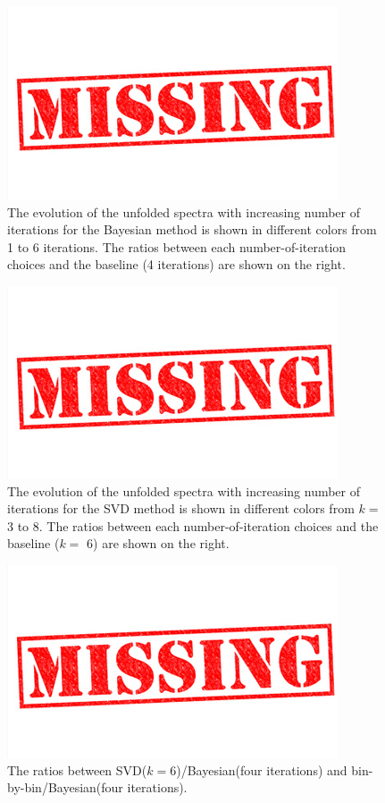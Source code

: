 \begin{figure}[bth]
\centering
\includegraphics[width=.2\textwidth]{missing}
\caption{The evolution of the unfolded spectra with increasing number of iterations for the Bayesian method is shown in different colors from 1 to 6 iterations.
The ratios between each number-of-iteration choices and the baseline (4 iterations) are shown on the right.}
\label{fig:unfBayesReg_pPb}
\end{figure}

\begin{figure}[bth]
\centering
\includegraphics[width=.2\textwidth]{missing}
\caption{The evolution of the unfolded spectra with increasing number of iterations for the SVD method is shown in different colors from $k=$ 3 to 8.
The ratios between each number-of-iteration choices and the baseline ($k=$ 6) are shown on the right.}
\label{fig:unfSVDReg_pPb}
\end{figure}


\begin{figure}[bth]
\centering
\includegraphics[width=.2\textwidth]{missing}
\caption{The ratios between SVD($k=6$)/Bayesian(four iterations) and bin-by-bin/Bayesian(four iterations).}
\label{fig:unfMethComp_pPb}
\end{figure}


